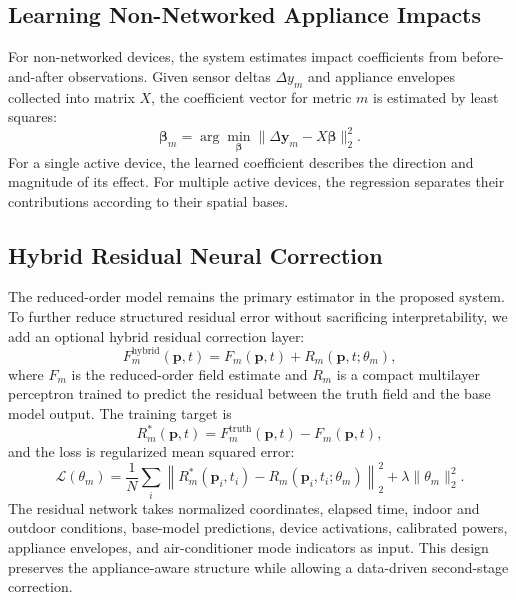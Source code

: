 \documentclass[conference]{IEEEtran}
\begin{document}
\subsection{Learning Non-Networked Appliance Impacts}
For non-networked devices, the system estimates impact coefficients from before-and-after observations. Given sensor deltas $\Delta y_m$ and appliance envelopes collected into matrix $X$, the coefficient vector for metric $m$ is estimated by least squares:
\begin{equation}
\boldsymbol{\beta}_m = \arg\min_{\boldsymbol{\beta}}\|\Delta \mathbf{y}_m-X\boldsymbol{\beta}\|_2^2.
\end{equation}
For a single active device, the learned coefficient describes the direction and magnitude of its effect. For multiple active devices, the regression separates their contributions according to their spatial bases.

\subsection{Hybrid Residual Neural Correction}
The reduced-order model remains the primary estimator in the proposed system. To further reduce structured residual error without sacrificing interpretability, we add an optional hybrid residual correction layer:
\begin{equation}
F^{\mathrm{hybrid}}_m(\mathbf{p},t)=F_m(\mathbf{p},t)+R_m(\mathbf{p},t;\theta_m),
\end{equation}
where $F_m$ is the reduced-order field estimate and $R_m$ is a compact multilayer perceptron trained to predict the residual between the truth field and the base model output. The training target is
\begin{equation}
R^*_m(\mathbf{p},t)=F^{\mathrm{truth}}_m(\mathbf{p},t)-F_m(\mathbf{p},t),
\end{equation}
and the loss is regularized mean squared error:
\begin{equation}
\mathcal{L}(\theta_m)=\frac{1}{N}\sum_i \left\|R^*_m(\mathbf{p}_i,t_i)-R_m(\mathbf{p}_i,t_i;\theta_m)\right\|_2^2+\lambda\|\theta_m\|_2^2.
\end{equation}
The residual network takes normalized coordinates, elapsed time, indoor and outdoor conditions, base-model predictions, device activations, calibrated powers, appliance envelopes, and air-conditioner mode indicators as input. This design preserves the appliance-aware structure while allowing a data-driven second-stage correction.
\end{document}
